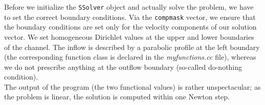 Before we initialize the \texttt{SSolver} object and actually solve the problem, we have to set the correct boundary conditions. Via the \texttt{compmask} vector, we ensure that the boundary conditions are set only for the velocity components of our solution vector. We set homogeneous Dirichlet values at the upper and lower boundaries of the channel. The inflow is described by a parabolic profile at the left boundary (the corresponding function class is declared in the \textit{myfunctions.cc} file), whereas we do not prescribe anything at the outflow boundary (so-called do-nothing condition).\\
The output of the program (the two functional values) is rather unspectacular; as the problem is linear, the solution is computed within one Newton step.


